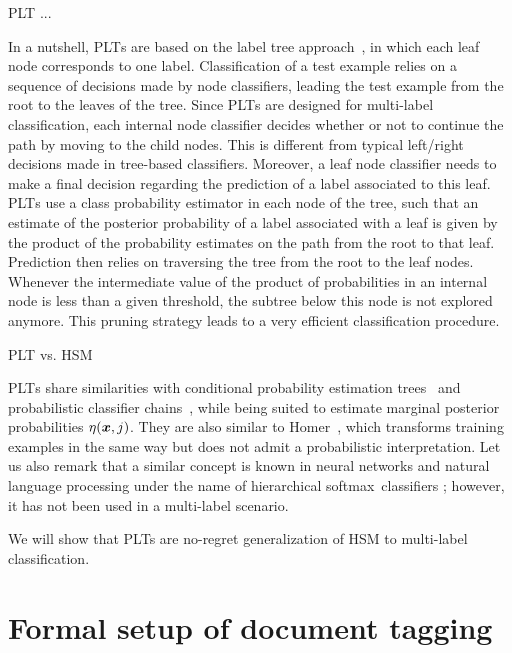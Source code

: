\documentclass{article}
\newcommand{\Algo}[1]{\textsc{#1}}
\newcommand{\sectionBefore}{-0pt}
\newcommand{\sectionAfter}{-0pt}
\begin{document}
PLT ... 

In a nutshell, \Algo{PLT}s are based on the label tree approach~\cite{Beygelzimer_et_al_2009a,Bengio_et_al_2010,Deng_et_al_2011}, in which each leaf node corresponds to one label. Classification of a test example relies on a sequence of decisions made by node classifiers, leading the test example from the root to the leaves of the tree. Since \Algo{PLT}s are designed for multi-label classification, each internal node classifier decides whether or not to continue the path by moving to the child nodes. This is different from typical left/right decisions made in tree-based classifiers.  Moreover, a leaf node classifier needs to make a final decision regarding the prediction of a label associated to this leaf. \Algo{PLT}s use a class probability estimator in each node of the tree, such that an estimate of the posterior probability of a label associated with a leaf is given by the product of the probability estimates on the path from the root to that leaf. Prediction then relies on traversing the tree from the root to the leaf nodes. Whenever the intermediate value of the product of probabilities in an internal node is less than a given threshold, the subtree below this node is not explored anymore. This pruning strategy leads to a very efficient classification procedure. %

PLT vs. HSM

\Algo{PLT}s share similarities with conditional probability estimation trees~\cite{Beygelzimer_et_al_2009b} and probabilistic classifier chains~\cite{Dembczynski_et_al_2010c}, while being suited to estimate marginal posterior probabilities $\eta(\boldsymbol{x},j)$. They are also similar to Homer~\cite{Tsoumakas_et_al_2008}, which transforms training examples in the same way but does not admit a probabilistic interpretation. Let us also remark that a similar concept is known in neural networks and natural language processing under the name of hierarchical softmax~classifiers \cite{Morin_Bengio_2005}; however, it has not been used in a multi-label scenario.

We will show that PLTs are no-regret generalization of HSM to multi-label classification. 



\vspace{\sectionBefore}
\section{Formal setup of document tagging}
\label{sec:formal}
\vspace{\sectionAfter}
\end{document}

